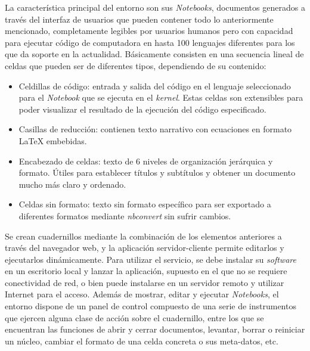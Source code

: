La característica principal del entorno son sus \textit{Notebooks}, documentos generados a través del interfaz de usuarios que pueden contener todo lo anteriormente mencionado, completamente legibles por usuarios humanos pero con capacidad para ejecutar código de computadora en hasta 100 lenguajes diferentes para los que da soporte en la actualidad. Básicamente consisten en una
secuencia lineal de celdas que pueden ser de diferentes tipos, dependiendo de su contenido:
\begin{itemize}
\item Celdillas de código: entrada y salida del código en el lenguaje seleccionado para el \textit{Notebook} que se ejecuta en el \textit{kernel}. Estas celdas son extensibles para poder visualizar el resultado de la ejecución del código especificado.
\item Casillas de reducción: contienen texto narrativo con ecuaciones en formato LaTeX embebidas.
\item Encabezado de celdas: texto de 6 niveles de organización jerárquica y formato. Útiles para establecer títulos y subtítulos y obtener un documento mucho más claro y ordenado.
\item Celdas sin formato: texto sin formato específico para ser exportado a diferentes formatos mediante \textit{nbconvert} sin sufrir cambios.
\end{itemize}
Se crean cuadernillos mediante la combinación de los elementos anteriores a través del navegador web, y la aplicación servidor-cliente permite editarlos y ejecutarlos dinámicamente. Para utilizar el servicio, se debe instalar su \textit{software} en un escritorio local y lanzar la aplicación, supuesto en el que no se requiere conectividad de red, o bien puede instalarse en un servidor remoto y utilizar Internet para el acceso. Además de mostrar, editar y ejecutar \textit{Notebooks}, el entorno dispone de un panel de control compuesto de una serie de instrumentos que ejercen alguna clase de acción sobre el cuadernillo, entre los que se encuentran las funciones de abrir y cerrar documentos, levantar, borrar o reiniciar un núcleo, cambiar el formato de una celda concreta o sus meta-datos, etc.

